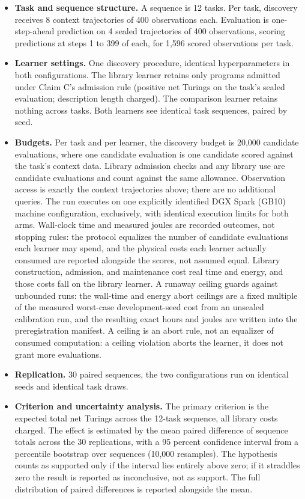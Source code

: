 \documentclass[11pt]{article}
\begin{document}
\begin{itemize}
\item \textbf{Task and sequence structure.} A sequence is 12 tasks. Per task, discovery receives 8 context trajectories of 400 observations each. Evaluation is one-step-ahead prediction on 4 sealed trajectories of 400 observations, scoring predictions at steps 1 to 399 of each, for 1,596 scored observations per task.
\item \textbf{Learner settings.} One discovery procedure, identical hyperparameters in both configurations. The library learner retains only programs admitted under Claim C's admission rule (positive net Turings on the task's sealed evaluation; description length charged). The comparison learner retains nothing across tasks. Both learners see identical task sequences, paired by seed.
\item \textbf{Budgets.} Per task and per learner, the discovery budget is 20,000 candidate evaluations, where one candidate evaluation is one candidate scored against the task's context data. Library admission checks and any library use are candidate evaluations and count against the same allowance. Observation access is exactly the context trajectories above; there are no additional queries. The run executes on one explicitly identified DGX Spark (GB10) machine configuration, exclusively, with identical execution limits for both arms. Wall-clock time and measured joules are recorded outcomes, not stopping rules: the protocol equalizes the number of candidate evaluations each learner may spend, and the physical costs each learner actually consumed are reported alongside the scores, not assumed equal. Library construction, admission, and maintenance cost real time and energy, and those costs fall on the library learner. A runaway ceiling guards against unbounded runs: the wall-time and energy abort ceilings are a fixed multiple of the measured worst-case development-seed cost from an unsealed calibration run, and the resulting exact hours and joules are written into the preregistration manifest. A ceiling is an abort rule, not an equalizer of consumed computation: a ceiling violation aborts the learner, it does not grant more evaluations.
\item \textbf{Replication.} 30 paired sequences, the two configurations run on identical seeds and identical task draws.
\item \textbf{Criterion and uncertainty analysis.} The primary criterion is the expected total net Turings across the 12-task sequence, all library costs charged. The effect is estimated by the mean paired difference of sequence totals across the 30 replications, with a 95 percent confidence interval from a percentile bootstrap over sequences (10,000 resamples). The hypothesis counts as supported only if the interval lies entirely above zero; if it straddles zero the result is reported as inconclusive, not as support. The full distribution of paired differences is reported alongside the mean.

\end{itemize}
\end{document}
